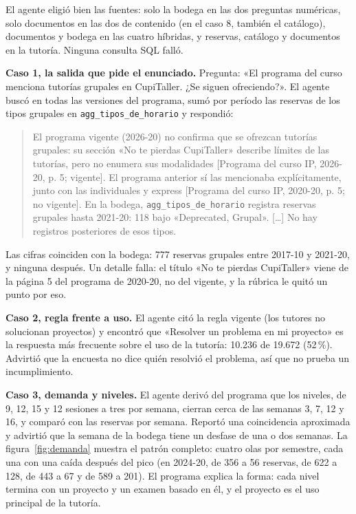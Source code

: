 \documentclass[11pt,letterpaper]{article}
\newcommand{\cod}[1]{\texttt{\small #1}}
\begin{document}
El agente eligió bien las fuentes: solo la bodega en las dos preguntas numéricas, solo documentos en las dos de contenido (en el caso 8, también el catálogo), documentos y bodega en las cuatro híbridas, y reservas, catálogo y documentos en la tutoría. Ninguna consulta SQL falló.

\textbf{Caso 1, la salida que pide el enunciado.} Pregunta: «El programa del curso menciona tutorías grupales en CupiTaller. ¿Se siguen ofreciendo?». El agente buscó en todas las versiones del programa, sumó por período las reservas de los tipos grupales en \cod{agg\_tipos\_de\_horario} y respondió:

\begin{quote}\small
El programa vigente (2026-20) no confirma que se ofrezcan tutorías grupales: su sección «No te pierdas CupiTaller» describe límites de las tutorías, pero no enumera sus modalidades [Programa del curso IP, 2026-20, p. 5; vigente]. El programa anterior sí las mencionaba explícitamente, junto con las individuales y express [Programa del curso IP, 2020-20, p. 5; no vigente]. En la bodega, \cod{agg\_tipos\_de\_horario} registra reservas grupales hasta 2021-20: 118 bajo «Deprecated, Grupal». [\ldots] No hay registros posteriores de esos tipos.
\end{quote}

Las cifras coinciden con la bodega: 777 reservas grupales entre 2017-10 y 2021-20, y ninguna después. Un detalle falla: el título «No te pierdas CupiTaller» viene de la página 5 del programa de 2020-20, no del vigente, y la rúbrica le quitó un punto por eso.

\textbf{Caso 2, regla frente a uso.} El agente citó la regla vigente (los tutores no solucionan proyectos) y encontró que «Resolver un problema en mi proyecto» es la respuesta más frecuente sobre el uso de la tutoría: 10.236 de 19.672 (52\,\%). Advirtió que la encuesta no dice quién resolvió el problema, así que no prueba un incumplimiento.

\textbf{Caso 3, demanda y niveles.} El agente derivó del programa que los niveles, de 9, 12, 15 y 12 sesiones a tres por semana, cierran cerca de las semanas 3, 7, 12 y 16, y comparó con las reservas por semana. Reportó una coincidencia aproximada y advirtió que la semana de la bodega tiene un desfase de una o dos semanas. La figura~\ref{fig:demanda} muestra el patrón completo: cuatro olas por semestre, cada una con una caída después del pico (en 2024-20, de 356 a 56 reservas, de 622 a 128, de 443 a 67 y de 589 a 201). El programa explica la forma: cada nivel termina con un proyecto y un examen basado en él, y el proyecto es el uso principal de la tutoría.
\end{document}
